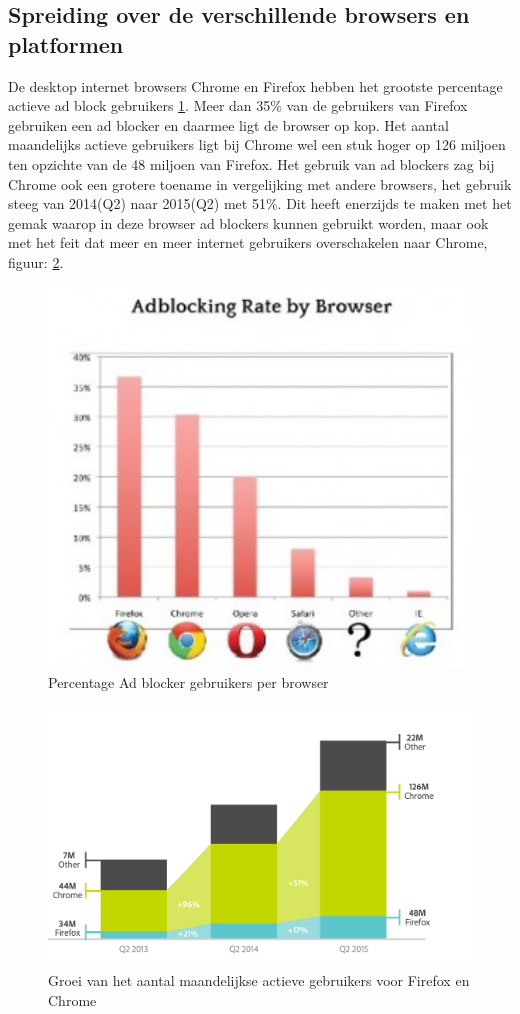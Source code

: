 \documentclass[pdftex,a4paper,12pt,twoside]{report}
\begin{document}
\subsection{Spreiding over de verschillende browsers en platformen}
\label{sec spreiding over de verschillende browsers}
De desktop internet browsers Chrome en Firefox hebben het grootste percentage actieve ad block gebruikers \ref{fig: Ad-blocking-by-browse}. Meer dan 35\% van de gebruikers van Firefox gebruiken een ad blocker en daarmee ligt de browser op kop. Het aantal maandelijks actieve gebruikers ligt bij Chrome wel een stuk hoger op 126 miljoen ten opzichte van de 48 miljoen van Firefox. Het gebruik van ad blockers zag bij Chrome ook een grotere toename in vergelijking met andere browsers, het gebruik steeg van 2014(Q2) naar 2015(Q2) met 51\%. Dit heeft enerzijds te maken met het gemak waarop in deze browser ad blockers kunnen gebruikt worden, maar ook met het feit dat meer en meer internet gebruikers overschakelen naar Chrome, figuur: \ref{fig: UsersPerBrowser}.
\begin{figure}[h!]
\centering
\includegraphics[width=12cm]{img/Ad-blocking-by-browse}
\caption{Percentage Ad blocker gebruikers per browser}
\label{fig: Ad-blocking-by-browse}
\end{figure}

\begin{figure}[h!]
\centering
\includegraphics[width=12cm]{img/UsersPerBrowser}
\caption{Groei van het aantal maandelijkse actieve gebruikers voor Firefox en Chrome}
\label{fig: UsersPerBrowser}
\end{figure}
\end{document}
